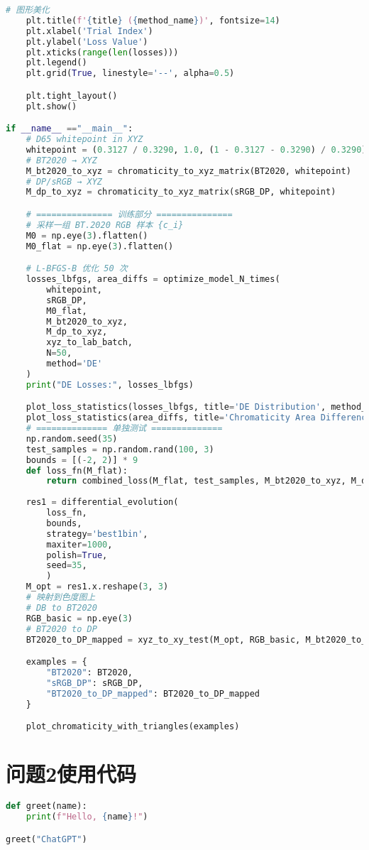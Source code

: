 \begin{lstlisting}[language=Python]
    # 图形美化
    plt.title(f'{title} ({method_name})', fontsize=14)
    plt.xlabel('Trial Index')
    plt.ylabel('Loss Value')
    plt.xticks(range(len(losses)))
    plt.legend()
    plt.grid(True, linestyle='--', alpha=0.5)

    plt.tight_layout()
    plt.show()

if __name__ =="__main__":
    # D65 whitepoint in XYZ
    whitepoint = (0.3127 / 0.3290, 1.0, (1 - 0.3127 - 0.3290) / 0.3290)
    # BT2020 → XYZ
    M_bt2020_to_xyz = chromaticity_to_xyz_matrix(BT2020, whitepoint)
    # DP/sRGB → XYZ
    M_dp_to_xyz = chromaticity_to_xyz_matrix(sRGB_DP, whitepoint)

    # =============== 训练部分 ===============
    # 采样一组 BT.2020 RGB 样本 {c_i}
    M0 = np.eye(3).flatten()
    M0_flat = np.eye(3).flatten()

    # L-BFGS-B 优化 50 次
    losses_lbfgs, area_diffs = optimize_model_N_times(
        whitepoint,
        sRGB_DP,
        M0_flat,
        M_bt2020_to_xyz,
        M_dp_to_xyz,
        xyz_to_lab_batch,
        N=50,
        method='DE'
    )
    print("DE Losses:", losses_lbfgs)

    plot_loss_statistics(losses_lbfgs, title='DE Distribution', method_name='Differential Evolution')
    plot_loss_statistics(area_diffs, title='Chromaticity Area Difference', method_name='Differential Evolution')
    # ============== 单独测试 ==============
    np.random.seed(35)
    test_samples = np.random.rand(100, 3)
    bounds = [(-2, 2)] * 9
    def loss_fn(M_flat):
        return combined_loss(M_flat, test_samples, M_bt2020_to_xyz, M_dp_to_xyz, xyz_to_lab_batch)
    
    res1 = differential_evolution(
        loss_fn,
        bounds,
        strategy='best1bin',
        maxiter=1000,
        polish=True,
        seed=35,
        )
    M_opt = res1.x.reshape(3, 3)
    # 映射到色度图上
    # DB to BT2020
    RGB_basic = np.eye(3)
    # BT2020 to DP
    BT2020_to_DP_mapped = xyz_to_xy_test(M_opt, RGB_basic, M_bt2020_to_xyz)

    examples = {
        "BT2020": BT2020,
        "sRGB_DP": sRGB_DP,
        "BT2020_to_DP_mapped": BT2020_to_DP_mapped
    }

    plot_chromaticity_with_triangles(examples)

\end{lstlisting}

\section[\hspace{-2pt}问题2使用代码]{{\heiti{} \hspace{-8pt}问题2使用代码}}
\begin{lstlisting}[language=Python]
def greet(name):
    print(f"Hello, {name}!")

greet("ChatGPT")
\end{lstlisting}

